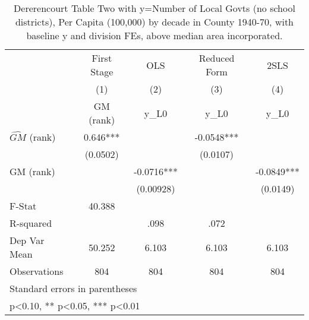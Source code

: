 \begin{table}[htbp]\centering
\def\sym#1{\ifmmode^{#1}\else\(^{#1}\)\fi}
\caption{Dererencourt Table Two with y=Number of Local Govts (no school districts), Per Capita (100,000) by decade in County 1940-70, with baseline y and division FEs, above median area incorporated.}
\begin{tabular}{l*{4}{c}}
\toprule
                    & First Stage   &         OLS   &Reduced Form   &        2SLS   \\
                    &\multicolumn{1}{c}{(1)}&\multicolumn{1}{c}{(2)}&\multicolumn{1}{c}{(3)}&\multicolumn{1}{c}{(4)}\\
                    &\multicolumn{1}{c}{GM  (rank)}&\multicolumn{1}{c}{y\_L0}&\multicolumn{1}{c}{y\_L0}&\multicolumn{1}{c}{y\_L0}\\
\midrule
$\hat{GM}$ (rank)   &       0.646***&               &     -0.0548***&               \\
                    &    (0.0502)   &               &    (0.0107)   &               \\
\addlinespace
GM  (rank)          &               &     -0.0716***&               &     -0.0849***\\
                    &               &   (0.00928)   &               &    (0.0149)   \\
\midrule
F-Stat              &      40.388   &               &               &               \\
R-squared           &               &        .098   &        .072   &               \\
Dep Var Mean        &      50.252   &       6.103   &       6.103   &       6.103   \\
Observations        &         804   &         804   &         804   &         804   \\
\bottomrule
\multicolumn{5}{l}{\footnotesize Standard errors in parentheses}\\
\multicolumn{5}{l}{\footnotesize * p<0.10, ** p<0.05, *** p<0.01}\\
\end{tabular}
\end{table}

